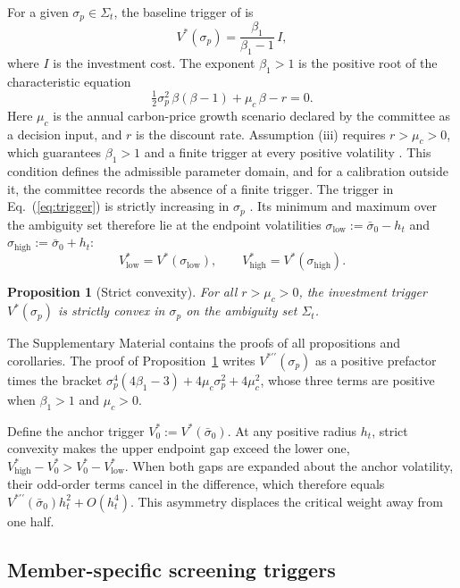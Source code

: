 \documentclass[5p,times,authoryear]{elsarticle}
\theoremstyle{plain}
\newtheorem{proposition}{Proposition}
\newcommand{\sbar}{\bar{\sigma}_0}
\newcommand{\Vlow}{V^{*}_{\mathrm{low}}}
\newcommand{\Vhigh}{V^{*}_{\mathrm{high}}}
\newcommand{\Vzero}{V^{*}_{0}}
\newcommand{\slow}{\sigma_{\mathrm{low}}}
\newcommand{\shigh}{\sigma_{\mathrm{high}}}
\begin{document}
For a given $\sigma_p\in\Sigma_t$, the baseline trigger of \citet{McDonaldSiegel1986} is
\begin{equation}
V^{*}(\sigma_p)=\frac{\beta_1}{\beta_1-1}\,I,
\label{eq:trigger}
\end{equation}
where $I$ is the investment cost. The exponent $\beta_1>1$ is the positive root of the characteristic equation
\begin{equation}
\tfrac{1}{2}\sigma_p^{2}\,\beta(\beta-1)+\mu_c\,\beta-r=0.
\label{eq:char}
\end{equation}
Here $\mu_c$ is the annual carbon-price growth scenario declared by the committee as a decision input, and $r$ is the discount rate. Assumption (iii) requires $r>\mu_c>0$, which guarantees $\beta_1>1$ and a finite trigger at every positive volatility \citep{DixitPindyck1994}. This condition defines the admissible parameter domain, and for a calibration outside it, the committee records the absence of a finite trigger. The trigger in Eq.~(\ref{eq:trigger}) is strictly increasing in $\sigma_p$ \citep{DixitPindyck1994}. Its minimum and maximum over the ambiguity set therefore lie at the endpoint volatilities $\slow:=\sbar-h_t$ and $\shigh:=\sbar+h_t$:
\begin{equation}
\Vlow=V^{*}(\slow),\qquad \Vhigh=V^{*}(\shigh).
\label{eq:endpoints}
\end{equation}

\begin{proposition}[Strict convexity]\label{prop:convex}
For all $r>\mu_c>0$, the investment trigger $V^{*}(\sigma_p)$ is strictly convex in $\sigma_p$ on the ambiguity set $\Sigma_t$.
\end{proposition}

The Supplementary Material contains the proofs of all propositions and corollaries. The proof of Proposition~\ref{prop:convex} writes $V^{*\prime\prime}(\sigma_p)$ as a positive prefactor times the bracket $\sigma_p^{4}(4\beta_1-3)+4\mu_c\sigma_p^{2}+4\mu_c^{2}$, whose three terms are positive when $\beta_1>1$ and $\mu_c>0$.

Define the anchor trigger $\Vzero:=V^{*}(\sbar)$. At any positive radius $h_t$, strict convexity makes the upper endpoint gap exceed the lower one, $\Vhigh-\Vzero>\Vzero-\Vlow$. When both gaps are expanded about the anchor volatility, their odd-order terms cancel in the difference, which therefore equals $V^{*\prime\prime}(\sbar)h_t^{2}+O(h_t^{4})$. This asymmetry displaces the critical weight away from one half.

\subsection{Member-specific screening triggers}
\end{document}
